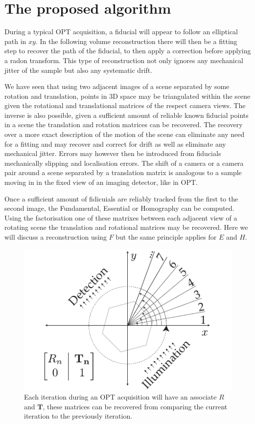 \section{The proposed algorithm}

During a typical OPT acquisition, a fiducial will appear to follow an elliptical path in $xy$.
In the following volume reconstruction there will then be a fitting step to recover the path of the fiducial, to then apply a correction before applying a radon transform.
This type of reconstruction not only ignores any mechanical jitter of the sample but also any systematic drift.

We have seen that using two adjacent images of a scene separated by some rotation and translation, points in 3D space may be triangulated within the scene given the rotational and translational matrices of the respect camera views.
The inverse is also possible, given a sufficient amount of reliable known fiducial points in a scene the translation and rotation matrices can be recovered.
The recovery over a more exact description of the motion of the scene can eliminate any need for a fitting and may recover and correct for drift as well as eliminate any mechanical jitter.
Errors may however then be introduced from fiducials mechanically slipping and localisation errors.
The shift of a camera or a camera pair around a scene separated by a translation matrix is analogous to a sample moving in in the fixed view of an imaging detector, like in OPT.

Once a sufficient amount of fidicuials are reliably tracked from the first to the second image, the Fundamental, Essential or Homography can be computed.
Using the factorisation one of these matrixes between each adjacent view of a rotating scene the translation and rotational matrices may be recovered.
Here we will discuss a reconstruction using $F$ but the same principle applies for $E$ and $H$.

\begin{figure}
  \centering
  \includegraphics{Chapters/flopt/Figs/PDF/flOPT_principle}
  \caption{Each iteration during an OPT acquisition will have an associate $R$ and $\mathbf{T}$, these matrices can be recovered from comparing the current iteration to the previously iteration.}
\end{figure}

